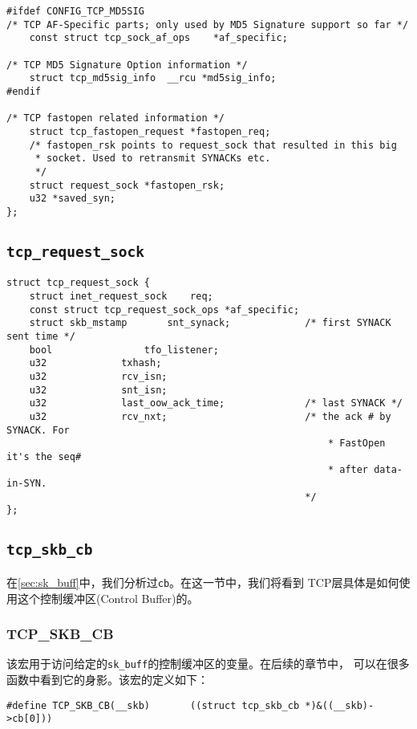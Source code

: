 \begin{verbatim}
#ifdef CONFIG_TCP_MD5SIG
/* TCP AF-Specific parts; only used by MD5 Signature support so far */
    const struct tcp_sock_af_ops    *af_specific;

/* TCP MD5 Signature Option information */
    struct tcp_md5sig_info  __rcu *md5sig_info;
#endif

/* TCP fastopen related information */
    struct tcp_fastopen_request *fastopen_req;
    /* fastopen_rsk points to request_sock that resulted in this big
     * socket. Used to retransmit SYNACKs etc.
     */
    struct request_sock *fastopen_rsk;
    u32 *saved_syn;
};
\end{verbatim}
        \subsection{\texttt{tcp_request_sock}}
\begin{verbatim}
struct tcp_request_sock {
    struct inet_request_sock    req;
    const struct tcp_request_sock_ops *af_specific;
    struct skb_mstamp       snt_synack;             /* first SYNACK sent time */
    bool                tfo_listener;
    u32             txhash;
    u32             rcv_isn;
    u32             snt_isn;
    u32             last_oow_ack_time;              /* last SYNACK */
    u32             rcv_nxt;                        /* the ack # by SYNACK. For
                                                        * FastOpen it's the seq#
                                                        * after data-in-SYN.
                                                    */
};
\end{verbatim}
        \subsection{\texttt{tcp_skb_cb}}
\label{sec:tcp_skb_cb}

在\ref{sec:sk_buff}中，我们分析过\texttt{cb}。在这一节中，我们将看到
TCP层具体是如何使用这个控制缓冲区(Control Buffer)的。

            \subsubsection{TCP\_SKB\_CB}
\label{subsec:tcp_skb_cb}

该宏用于访问给定的\texttt{sk_buff}的控制缓冲区的变量。在后续的章节中，
可以在很多函数中看到它的身影。该宏的定义如下：

\begin{verbatim}
#define TCP_SKB_CB(__skb)       ((struct tcp_skb_cb *)&((__skb)->cb[0]))
\end{verbatim}

